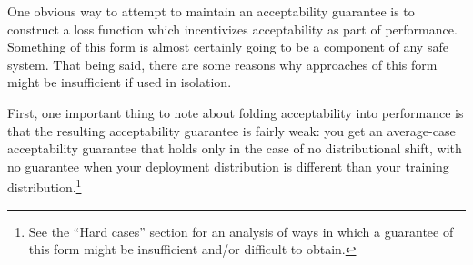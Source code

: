 \documentclass{amsart}
\begin{document}
One obvious way to attempt to maintain an acceptability guarantee is to construct a loss function which incentivizes acceptability as part of performance. Something of this form is almost certainly going to be a component of any safe system. That being said, there are some reasons why approaches of this form might be insufficient if used in isolation.

First, one important thing to note about folding acceptability into performance is that the resulting acceptability guarantee is fairly weak: you get an average-case acceptability guarantee that holds only in the case of no distributional shift, with no guarantee when your deployment distribution is different than your training distribution.\footnote{See the ``Hard cases'' section for an analysis of ways in which a guarantee of this form might be insufficient and/or difficult to obtain.}
\end{document}

